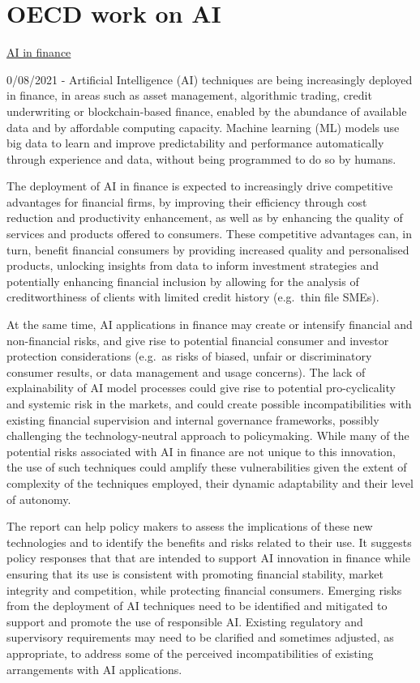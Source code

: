 \documentclass[
]{book}
\begin{document}
\hypertarget{oecd-work-on-ai}{%
\section{OECD work on AI}\label{oecd-work-on-ai}}

\href{https://www.oecd.org/finance/artificial-intelligence-machine-learning-big-data-in-finance.htm}{AI in finance}

0/08/2021 - Artificial Intelligence (AI) techniques are being increasingly deployed in finance, in areas such as asset management, algorithmic trading, credit underwriting or blockchain-based finance, enabled by the abundance of available data and by affordable computing capacity. Machine learning (ML) models use big data to learn and improve predictability and performance automatically through experience and data, without being programmed to do so by humans.

The deployment of AI in finance is expected to increasingly drive competitive advantages for financial firms, by improving their efficiency through cost reduction and productivity enhancement, as well as by enhancing the quality of services and products offered to consumers. These competitive advantages can, in turn, benefit financial consumers by providing increased quality and personalised products, unlocking insights from data to inform investment strategies and potentially enhancing financial inclusion by allowing for the analysis of creditworthiness of clients with limited credit history (e.g.~thin file SMEs).

At the same time, AI applications in finance may create or intensify financial and non-financial risks, and give rise to potential financial consumer and investor protection considerations (e.g.~as risks of biased, unfair or discriminatory consumer results, or data management and usage concerns). The lack of explainability of AI model processes could give rise to potential pro-cyclicality and systemic risk in the markets, and could create possible incompatibilities with existing financial supervision and internal governance frameworks, possibly challenging the technology-neutral approach to policymaking. While many of the potential risks associated with AI in finance are not unique to this innovation, the use of such techniques could amplify these vulnerabilities given the extent of complexity of the techniques employed, their dynamic adaptability and their level of autonomy.

The report can help policy makers to assess the implications of these new technologies and to identify the benefits and risks related to their use. It suggests policy responses that that are intended to support AI innovation in finance while ensuring that its use is consistent with promoting financial stability, market integrity and competition, while protecting financial consumers. Emerging risks from the deployment of AI techniques need to be identified and mitigated to support and promote the use of responsible AI. Existing regulatory and supervisory requirements may need to be clarified and sometimes adjusted, as appropriate, to address some of the perceived incompatibilities of existing arrangements with AI applications.
\end{document}
